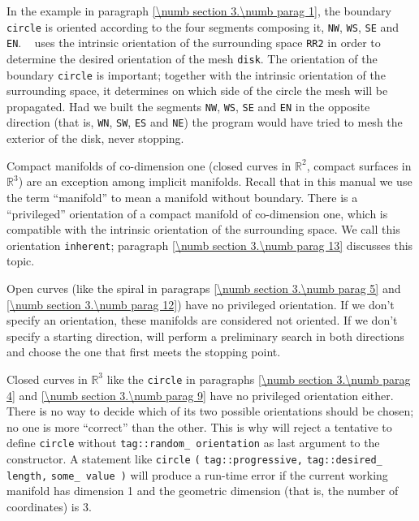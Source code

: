 In the example in paragraph \ref{\numb section 3.\numb parag 1}, the boundary {\small\tt circle}
is oriented according to the four segments composing it, {\small\tt NW}, {\small\tt WS},
{\small\tt SE} and {\small\tt EN}.
\ {\ManiFEM} uses the intrinsic orientation of the surrounding space {\small\tt RR2} in order
to determine the desired orientation of the mesh {\small\tt disk}.
The orientation of the boundary {\small\tt circle} is important;
together with the intrinsic orientation of the surrounding space,
it determines on which side of the circle the mesh will be propagated.
Had we built the segments {\small\tt NW}, {\small\tt WS}, {\small\tt SE} and {\small\tt EN} in the
opposite direction (that is, {\small\tt WN}, {\small\tt SW}, {\small\tt ES} and {\small\tt NE})
the program would have tried to mesh the exterior of the disk, never stopping.

Compact manifolds of co-dimension one (closed curves in $ \mathbb{R}^2 $,
compact surfaces in $ \mathbb{R}^3 $) are an exception among implicit manifolds.
Recall that in this manual we use the term ``manifold'' to mean a manifold without boundary.
There is a ``privileged'' orientation of a compact manifold of co-dimension one,
which is compatible with the intrinsic orientation of the surrounding space.
We call this orientation {\small\tt inherent}; paragraph \ref{\numb section 3.\numb parag 13}
discusses this topic.

Open curves (like the spiral in paragraps \ref{\numb section 3.\numb parag 5} and
\ref{\numb section 3.\numb parag 12}) have no privileged orientation.
If we don't specify an orientation, these manifolds are considered not oriented.
If we don't specify a starting direction, {\maniFEM} will perform a preliminary search
in both directions and choose the one that first meets the stopping point.

Closed curves in $ \mathbb{R}^3 $ like the {\small\tt circle} in paragraphs
\ref{\numb section 3.\numb parag 4} and \ref{\numb section 3.\numb parag 9}
have no privileged orientation either.
There is no way to decide which of its two possible orientations
should be chosen; no one is more ``correct'' than the other.
This is why {\maniFEM} will reject a tentative to define {\small\tt circle} without
{\small\tt \textcolor{tag}{tag}::random\_\,orientation} as last argument to the {\small\tt {}} constructor.
A statement like {\small\tt {}} {\small\tt circle} {\small\tt (}
{\small\tt \textcolor{tag}{tag}::progressive,} {\small\tt\textcolor{tag}{tag}::desired\_\,length,}
{\small\tt some\_\,value )}
will produce a run-time error if the current working manifold has dimension 1 and
the geometric dimension (that is, the number of coordinates) is 3.

